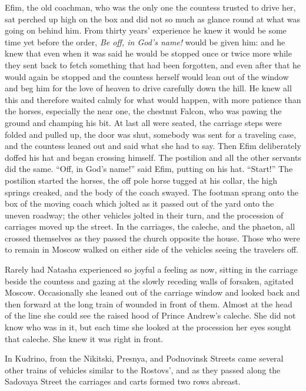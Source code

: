 Efim, the old coachman, who was the only one the countess trusted
to drive her, sat perched up high on the box and did not so much
as glance round at what was going on behind him. From thirty
years' experience he knew it would be some time yet before the
order, \emph{Be off, in God's name!} would be given him: and he
knew that even when it was said he would be stopped once or twice
more while they sent back to fetch something that had been
forgotten, and even after that he would again be stopped and the
countess herself would lean out of the window and beg him for the
love of heaven to drive carefully down the hill. He knew all this
and therefore waited calmly for what would happen, with more
patience than the horses, especially the near one, the chestnut
Falcon, who was pawing the ground and champing his bit. At last
all were seated, the carriage steps were folded and pulled up,
the door was shut, somebody was sent for a traveling case, and
the countess leaned out and said what she had to say. Then Efim
deliberately doffed his hat and began crossing himself. The
postilion and all the other servants did the same. ``Off, in
God's name!'' said Efim, putting on his hat. ``Start!'' The
postilion started the horses, the off pole horse tugged at his
collar, the high springs creaked, and the body of the coach
swayed. The footman sprang onto the box of the moving coach which
jolted as it passed out of the yard onto the uneven roadway; the
other vehicles jolted in their turn, and the procession of
carriages moved up the street. In the carriages, the caleche, and
the phaeton, all crossed themselves as they passed the church
opposite the house. Those who were to remain in Moscow walked on
either side of the vehicles seeing the travelers off.

Rarely had Natasha experienced so joyful a feeling as now,
sitting in the carriage beside the countess and gazing at the
slowly receding walls of forsaken, agitated Moscow. Occasionally
she leaned out of the carriage window and looked back and then
forward at the long train of wounded in front of them. Almost at
the head of the line she could see the raised hood of Prince
Andrew's caleche. She did not know who was in it, but each time
she looked at the procession her eyes sought that caleche. She
knew it was right in front.

In Kudrino, from the Nikitski, Presnya, and Podnovinsk Streets
came several other trains of vehicles similar to the Rostovs',
and as they passed along the Sadovaya Street the carriages and
carts formed two rows abreast.

